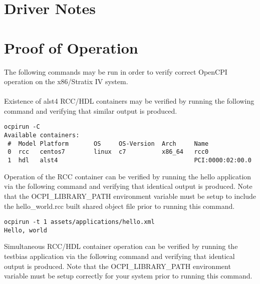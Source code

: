 \documentclass{article}
\begin{document}


\section{Driver Notes}


\section{Proof of Operation}
The following commands may be run in order to verify correct OpenCPI operation on the x86/Stratix IV system.\\ \\
Existence of alst4 RCC/HDL containers may be verified by running the following command and verifying that similar output is produced.\\
\begin{lstlisting}
ocpirun -C
Available containers:
 #  Model Platform       OS     OS-Version  Arch     Name
 0  rcc   centos7        linux  c7          x86_64   rcc0
 1  hdl   alst4                                      PCI:0000:02:00.0
\end{lstlisting}
Operation of the RCC container can be verified by running the hello application via the following command and verifying that identical output is produced. Note that the OCPI\_LIBRARY\_PATH environment variable must be setup to include the hello\_world.rcc built shared object file prior to running this command.
\begin{lstlisting}
ocpirun -t 1 assets/applications/hello.xml
Hello, world
\end{lstlisting}
Simultaneous RCC/HDL container operation can be verified by running the testbias application via the following command and verifying that identical output is produced. Note that the OCPI\_LIBRARY\_PATH environment variable must be setup correctly for your system prior to running this command.\\
\end{document}
